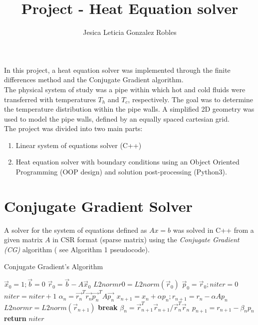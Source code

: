\documentclass[a4paper]{article}
\title{Project - Heat Equation solver \vspace{-0.5em}}
\author{Jesica Leticia Gonzalez Robles \vspace{-0.5em}}
\date{}
\begin{document}
\maketitle
In this project, a heat equation solver was implemented through the finite differences method and the Conjugate Gradient algorithm.\\

The physical system of study was a pipe within which hot and cold fluids were transferred with temperatures $T_{h}$ and $T_c$, respectively. The goal was to determine the temperature distribution within the pipe walls. A simplified 2D geometry was used to model the pipe walls, defined by an equally spaced cartesian grid. \\

The project was divided into two main parts:
\begin{enumerate}
    \item Linear system of equations solver (C++)
    \item Heat equation solver with boundary conditions using an Object Oriented Programming (OOP design) and solution post-processing (Python3).
\end{enumerate}


\section{Conjugate Gradient Solver}

A solver for the system of equations defined as $Ax = b $ was solved in C++ from a given matrix $A$ in CSR format (sparse matrix) using the \textit{Conjugate Gradient (CG)} algorithm ( see Algorithm 1 pseudocode).

\begin{algorithm}
\caption{Conjugate Gradient's Algorithm}\label{alg:CG}
\begin{algorithmic}
\State $\vec{x}_{0} = 1; \vec{b} = 0$ 
\State $\vec{r}_{0} = \vec{b} - A\vec{x}_{0}$
\State $L2normr0 = L2norm(\vec{r}_{0})$
\State $\vec{p}_{0} = \vec{r}_{0} ; niter = 0$
\State $niter = niter +1$
\State $\alpha_{n} = \vec{r_{n}}^{T}\vec{r_{n}}{\vec{p_{n}}^{T}A\vec{p_{n}}}$
\State $x_{n+1} = x_{n} + \alpha p_{n} ; r_{n+1} = r_{n} - \alpha A p_{n}$
\State $L2normr = L2norm(\vec{r}_{n+1})$
 
\State \textbf{break}
\EndIf
\State $\beta_{n} = \vec{r}_{n+1}^{T}\vec{r}_{n+1} / \vec{r}_{n}^{T}\vec{r}_{n}$
\State $p_{n+1} = r_{n+1} - \beta_{n}p_{n}$
\EndWhile
\State \textbf{return} $niter$
\EndProcedure
\end{algorithmic}
\end{algorithm}
\end{document}
